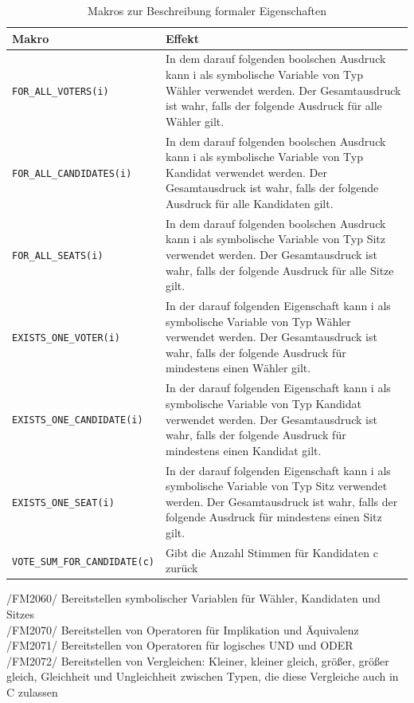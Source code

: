 \documentclass[a4paper]{scrreprt}
\begin{document}
\begin{table}[H]
\caption{Makros zur Beschreibung formaler Eigenschaften}
\begin{tabular}{|p{5cm}|p{10cm}|}

Makro & Effekt \\
\hline 
\verb!FOR_ALL_VOTERS(i)! & In dem darauf folgenden boolschen Ausdruck kann i als symbolische Variable von Typ Wähler verwendet werden. Der Gesamtausdruck ist wahr, falls der folgende Ausdruck für alle Wähler gilt. \\
\hline 
\verb!FOR_ALL_CANDIDATES(i)! & In dem darauf folgenden boolschen Ausdruck kann i als symbolische Variable von Typ Kandidat verwendet werden. Der Gesamtausdruck ist wahr, falls der folgende Ausdruck für alle Kandidaten gilt. \\
\hline 
\verb!FOR_ALL_SEATS(i)! & In dem darauf folgenden boolschen Ausdruck kann i als symbolische Variable von Typ Sitz verwendet werden. Der Gesamtausdruck ist wahr, falls der folgende Ausdruck für alle Sitze gilt. \\
\hline 
\verb!EXISTS_ONE_VOTER(i)! & In der darauf folgenden Eigenschaft kann i als symbolische Variable von Typ Wähler verwendet werden. Der Gesamtausdruck ist wahr, falls der folgende Ausdruck für mindestens einen Wähler gilt. \\
\hline 
\verb!EXISTS_ONE_CANDIDATE(i)! & In der darauf folgenden Eigenschaft kann i als symbolische Variable von Typ Kandidat verwendet werden. Der Gesamtausdruck ist wahr, falls der folgende Ausdruck für mindestens einen Kandidat gilt. \\
\hline 
\verb!EXISTS_ONE_SEAT(i)! & In der darauf folgenden Eigenschaft kann i als symbolische Variable von Typ Sitz verwendet werden. Der Gesamtausdruck ist wahr, falls der folgende Ausdruck für mindestens einen Sitz gilt. \\
\hline 
\verb!VOTE_SUM_FOR_CANDIDATE(c)! & Gibt die Anzahl Stimmen für Kandidaten c zurück\\
\end{tabular}
\label{table:Macros_for_formal_Attributes}
\end{table}
/FM2060/ Bereitstellen symbolischer Variablen für Wähler, Kandidaten und Sitzes \\
/FM2070/ Bereitstellen von Operatoren für Implikation und Äquivalenz \\
/FM2071/ Bereitstellen von Operatoren für logisches UND und ODER \\
/FM2072/ Bereitstellen von Vergleichen: Kleiner, kleiner gleich, größer, größer gleich,  Gleichheit und Ungleichheit zwischen Typen, die diese Vergleiche auch in C zulassen \\
\end{document}
